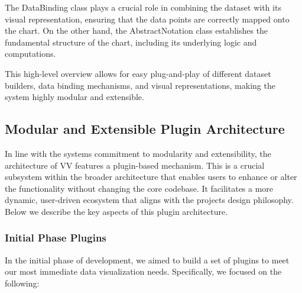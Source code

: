 The DataBinding class plays a crucial role in combining the dataset with
its visual representation, ensuring that the data points are correctly
mapped onto the chart. On the other hand, the AbstractNotation class
establishes the fundamental structure of the chart, including its
underlying logic and computations.

This high-level overview allows for easy plug-and-play of different
dataset builders, data binding mechanisms, and visual representations,
making the system highly modular and extensible.

\subsection{Modular and Extensible Plugin
Architecture}\label{modular-and-extensible-plugin-architecture}

In line with the system\textquotesingle s commitment to modularity and
extensibility, the architecture of VV features a plugin-based mechanism.
This is a crucial subsystem within the broader architecture that enables
users to enhance or alter the functionality without changing the core
codebase. It facilitates a more dynamic, user-driven ecosystem that
aligns with the project\textquotesingle s design philosophy. Below we
describe the key aspects of this plugin architecture.

\subsubsection{Initial Phase Plugins}\label{initial-phase-plugins}

In the initial phase of development, we aimed to build a set of plugins
to meet our most immediate data visualization needs. Specifically, we
focused on the following:

